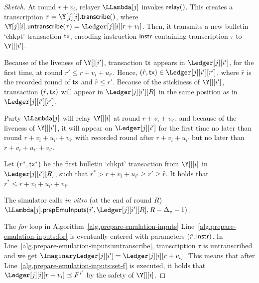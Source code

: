 \begin{proof}[Sketch]



  At round $r + v_i$, relayer $\LLambda[j]$ invokes $\textsf{relay}()$.
  This creates a transcription $\tau = \Y[j][i].\transcribe()$, where
  $\Y[j][i].\untranscribe(\tau) = \Ledger[j][i][r + v_i]$.
  Then, it transmits a new bulletin `chkpt'
  transaction $\textsf{tx}$, encoding instruction $\textsf{instr}$ containing transcription $\tau$ to $\Y[][i']$.

  Because of the liveness of $\Y[][i']$,
  transaction $\textsf{tx}$ appears in $\Ledger[j][i']$, for the first time,
  at round $r' \leq r + v_i + u_{i'}$.
  Hence, $(\hat{r}, \tx) \in \Ledger[j][i'][r']$, where $\hat{r}$ is the recorded round of $\textsf{tx}$
  and $\hat{r} \leq r'$. Because of the stickiness of $\Y[][i']$, transaction $(\hat{r}, \textsf{tx})$ will
  appear in $\Ledger[j][i'][R]$ in the same position as in $\Ledger[j][i'][r']$.

  Party $\LLambda[j]$ will relay $\Y[][i]$ at round $r + v_i + v_{i'}$, and
  because of the liveness of $\Y[][i']$, it will appear on $\Ledger[j][i']$ for the
  first time no later than round $r + v_i + u_{i'} + v_{i'}$ with recorded round
  after $r + v_i + u_{i'}$ but no later than $r + v_i + u_{i'} + v_{i'}$.

  Let $(r^*, \textsf{tx}^*)$ be the first bulletin `chkpt' transaction from $\Y[][i]$ in $\Ledger[j][i'][R]$, such that
  $r^* > r + v_{i} + u_{i'} \geq r' \geq \hat{r}$. It holds that $r^* \leq r + v_{i} + u_{i'} + v_{i'}$.

  The simulator calls \emph{in vitro} (at the end of round $R$)
  $\LLambda[j].\prepareEmulationInputs(i', \Ledger[j][i'][R], R - \Delta_v - 1)$.

  The \emph{for} loop in Algorithm~\ref{alg.prepare-emulation-inputs}
  Line~\ref{alg.prepare-emulation-inputs:for} is eventually entered with
  parameters $(\hat{r}, \textsf{instr})$.
  In Line~\ref{alg.prepare-emulation-inputs:untranscribe}, transcription $\tau$
  is untranscribed and we get $\ImaginaryLedger[j][i'] = \Ledger[j][i][r + v_i]$.
  This means that after Line~\ref{alg.prepare-emulation-inputs:set-f} is executed,
  it holds that $\Ledger[j][i][r + v_i] \preceq F^{i'}$ by the safety of $\Y[][i]$.


\end{proof}

